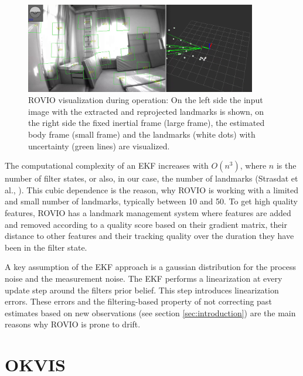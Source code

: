 \begin{figure}
   \centering
   \includegraphics[width=0.9\textwidth]{images/rovio_frontend.png}
   \caption{ROVIO visualization during operation: On the left side the input image with the extracted and reprojected landmarks is shown, on the right side the fixed inertial frame (large frame), the estimated body frame (small frame) and the landmarks (white dots) with uncertainty (green lines) are visualized.}
   \label{pics:rovio_frontend}
\end{figure}

The computational complexity of an EKF increases with $O(n^3)$, where $n$ is the number of filter states, or also, in our case, the number of landmarks (Strasdat et al., \cite{strasdat2010real}). This cubic dependence is the reason, why ROVIO is working with a limited and small number of landmarks, typically between 10 and 50. To get high quality features, ROVIO has a landmark management system where features are added and removed according to a quality score based on their gradient matrix, their distance to other features and their tracking quality over the duration they have been in the filter state. 

A key assumption of the EKF approach is a gaussian distribution for the process noise and the measurement noise. The EKF performs a linearization at every update step around the filters prior belief. This step introduces linearization errors. These errors and the filtering-based property of not correcting past estimates based on new observations (see section \ref{sec:introduction}) are the main reasons why ROVIO is prone to drift.



\section{OKVIS}
\label{sec:okvis}

